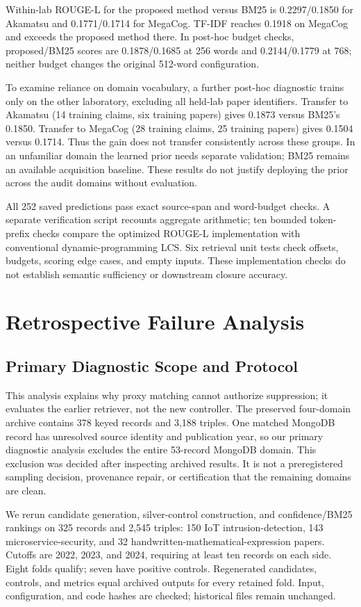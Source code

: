 \documentclass[runningheads]{llncs}
\begin{document}
Within-lab ROUGE-L for the proposed method versus BM25 is 0.2297/0.1850 for Akamatsu and 0.1771/0.1714 for MegaCog. TF-IDF reaches 0.1918 on MegaCog and exceeds the proposed method there. In post-hoc budget checks, proposed/BM25 scores are 0.1878/0.1685 at 256 words and 0.2144/0.1779 at 768; neither budget changes the original 512-word configuration.

To examine reliance on domain vocabulary, a further post-hoc diagnostic trains only on the other laboratory, excluding all held-lab paper identifiers. Transfer to Akamatsu (14 training claims, six training papers) gives 0.1873 versus BM25's 0.1850. Transfer to MegaCog (28 training claims, 25 training papers) gives 0.1504 versus 0.1714. Thus the gain does not transfer consistently across these groups. In an unfamiliar domain the learned prior needs separate validation; BM25 remains an available acquisition baseline. These results do not justify deploying the prior across the audit domains without evaluation.

All 252 saved predictions pass exact source-span and word-budget checks. A separate verification script recounts aggregate arithmetic; ten bounded token-prefix checks compare the optimized ROUGE-L implementation with conventional dynamic-programming LCS. Six retrieval unit tests check offsets, budgets, scoring edge cases, and empty inputs. These implementation checks do not establish semantic sufficiency or downstream closure accuracy.

\section{Retrospective Failure Analysis}
\subsection{Primary Diagnostic Scope and Protocol}
This analysis explains why proxy matching cannot authorize suppression; it evaluates the earlier retriever, not the new controller. The preserved four-domain archive contains 378 keyed records and 3,188 triples. One matched MongoDB record has unresolved source identity and publication year, so our primary diagnostic analysis excludes the entire 53-record MongoDB domain. This exclusion was decided after inspecting archived results. It is not a preregistered sampling decision, provenance repair, or certification that the remaining domains are clean.

We rerun candidate generation, silver-control construction, and confidence/BM25 rankings on 325 records and 2,545 triples: 150 IoT intrusion-detection, 143 microservice-security, and 32 handwritten-mathematical-expression papers. Cutoffs are 2022, 2023, and 2024, requiring at least ten records on each side. Eight folds qualify; seven have positive controls. Regenerated candidates, controls, and metrics equal archived outputs for every retained fold. Input, configuration, and code hashes are checked; historical files remain unchanged.
\end{document}
